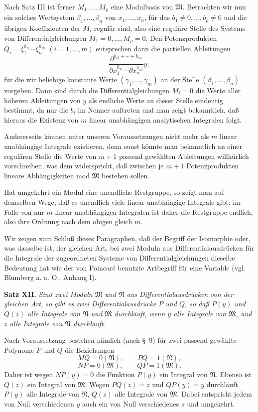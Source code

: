 \documentclass[11pt]{article}
\begin{document}
Nach Satz III ist ferner $M_1,
\ldots,M_\rho$ eine Modulbasis von $\mathfrak M$. Betrachten wir nun ein solches Wertsystem $\beta_1,
\ldots,\beta_n$ von $x_1,
\ldots,x_n$, für das $b_1\ne0,
\ldots,b_\rho\ne0$ und die übrigen Koeffizienten der $M_i$ regulär sind, also eine reguläre Stelle des Systems von Differentialgleichungen $M_1=0,
\ldots,M_\rho=0$. Den Potenzprodukten $Q_i=\xi_1^{h_{i1}}\cdots\xi_n^{h_{in}}$ $(i=1,
\ldots,m)$ entsprechen dann die partiellen Ableitungen
\[
 \frac{\partial^{h_{i1}+\cdots+h_{in}}}{\partial x_1^{h_{i1}}\cdots\partial x_n^{h_{in}}}y,
\]
für die wir beliebige konstante Werte $(\gamma_1,
\ldots,\gamma_m)$ an der Stelle $(\beta_1,
\ldots,\beta_n)$ vorgeben. Dann sind durch die Differentialgleichungen $M_i=0$ die Werte aller höheren Ableitungen von $y$ als endliche Werte an dieser Stelle eindeutig bestimmt, da nur die $b_i$ im Nenner auftreten und man zeigt bekanntlich, daß hieraus die Existenz von $m$ linear unabhängigen analytischen Integralen folgt.

Andererseits können unter unseren Voraussetzungen nicht mehr als $m$ linear unabhängige Integrale existieren, denn sonst könnte man bekanntlich an einer regulären Stelle die Werte von $m+1$ passend gewählten Ableitungen willkürlich vorschreiben, was dem widerspricht, daß zwischen je $m+1$ Potenzprodukten lineare Abhängigkeiten mod $\mathfrak M$ bestehen sollen.

Hat umgekehrt ein Modul eine unendliche Restgruppe, so zeigt man auf demselben Wege, daß es unendlich viele linear unabhängige Integrale gibt; im Falle von nur $m$ linear unabhängigen Integralen ist daher die Restgruppe endlich, also ihre Ordnung nach dem obigen gleich $m$.

Wir zeigen zum Schluß dieses Paragraphen, daß der Begriff der Isomorphie oder, was dasselbe ist, der gleichen Art, bei zwei Moduln aus Differentialausdrücken für die Integrale der zugeordneten Systeme von Differentialgleichungen dieselbe Bedeutung hat wie der von Poincaré benutzte Artbegriff für eine Variable (vgl. Blumberg a. a. O., Anhang I).

\textbf{Satz XII.} \emph{Sind zwei Moduln $\mathfrak M$ und $\mathfrak N$ aus Differentialausdrücken von der gleichen Art, so gibt es zwei Differentialausdrücke $P$ und $Q$, so daß $P(y)$ und $Q(z)$ alle Integrale von $\mathfrak N$ und $\mathfrak M$ durchläuft, wenn $y$ alle Integrale von $\mathfrak M$, und $z$ alle Integrale von $\mathfrak N$ durchläuft.}

Nach Voraussetzung bestehen nämlich (nach \S~9) für zwei passend gewählte Polynome $P$ und $Q$ die Beziehungen
\[
 MQ=0(\mathfrak N),\qquad PQ=1(\mathfrak N),
\]
\[
 NP=0(\mathfrak M),\qquad QP=1(\mathfrak M).
\]
Daher ist wegen $NP(y)=0$ die Funktion $P(y)$ ein Integral von $\mathfrak N$. Ebenso ist $Q(z)$ ein Integral von $\mathfrak M$. Wegen $PQ(z)=z$ und $QP(y)=y$ durchläuft $P(y)$ alle Integrale von $\mathfrak N$, $Q(z)$ alle Integrale von $\mathfrak M$. Dabei entspricht jedem von Null verschiedenen $y$ auch ein von Null verschiedenes $z$ und umgekehrt.
\end{document}
